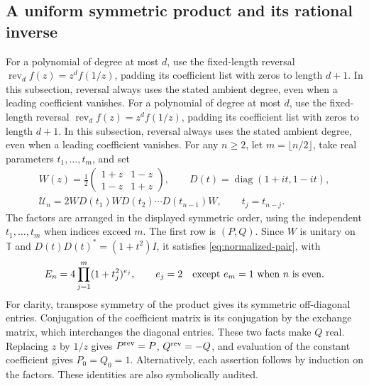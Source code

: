 \documentclass[11pt]{article}
\newcommand{\T}{\mathbb T}
\newcommand{\diag}{\operatorname{diag}}
\begin{document}
\subsection{A uniform symmetric product and its rational inverse}\label{sec:QSP}
For a polynomial of degree at most $d$, use the fixed-length reversal
$\operatorname{rev}_d f(z)=z^df(1/z)$, padding its coefficient list
with zeros to length $d+1$. In this subsection, reversal always uses
the stated ambient degree, even when a leading coefficient vanishes.
For a polynomial of degree at most $d$, use the fixed-length reversal
$\operatorname{rev}_d f(z)=z^df(1/z)$, padding its coefficient list
with zeros to length $d+1$. In this subsection, reversal always uses
the stated ambient degree, even when a leading coefficient vanishes.
For any $n\ge2$, let $m=\lfloor n/2\rfloor$, take real parameters
$t_1,\ldots,t_m$, and set
\begin{equation}\label{eq:QSP-product}
\begin{gathered}
 W(z)=\frac12\begin{pmatrix}1+z&1-z\\1-z&1+z\end{pmatrix},\qquad
 D(t)=\diag(1+it,1-it),\\
 \mathcal U_n=2W D(t_1)W D(t_2)\cdots D(t_{n-1})W,
 \qquad t_j=t_{n-j}.
\end{gathered}
\end{equation}
The factors are arranged in the displayed symmetric order, using the
independent $t_1,\ldots,t_m$ when indices exceed $m$.
The first row is $(P,Q)$. Since $W$ is unitary on $\T$ and
$D(t)D(t)^*=(1+t^2)I$, it satisfies \eqref{eq:normalized-pair}, with
\begin{equation}\label{eq:QSP-energy}
 E_n=4\prod_{j=1}^m(1+t_j^2)^{e_j},\qquad
 e_j=2\quad\hbox{except }e_m=1\hbox{ when }n\hbox{ is even}.
\end{equation}
For clarity, transpose symmetry of the product gives its symmetric
off-diagonal entries. Conjugation of the coefficient matrix is its
conjugation by the exchange matrix, which interchanges the diagonal
entries. These two facts make $Q$ real. Replacing $z$ by $1/z$ gives
$P^{\rm rev}=P$, $Q^{\rm rev}=-Q$, and evaluation of the constant
coefficient gives $P_0=Q_0=1$. Alternatively, each assertion follows by
induction on the factors. These identities are also symbolically audited.
\end{document}
